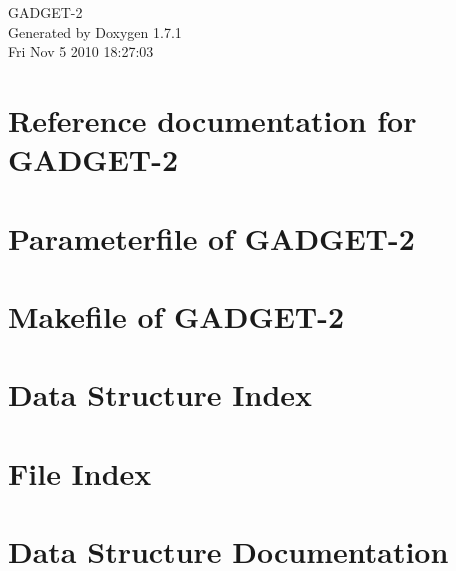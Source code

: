 \documentclass[a4paper]{book}
\begin{document}
\hypersetup{pageanchor=false}
\begin{titlepage}
\vspace*{7cm}
\begin{center}
{\Large GADGET-\/2 }\\
\vspace*{1cm}
{\large Generated by Doxygen 1.7.1}\\
\vspace*{0.5cm}
{\small Fri Nov 5 2010 18:27:03}\\
\end{center}
\end{titlepage}
\clearemptydoublepage
{}
\tableofcontents
\clearemptydoublepage
{}
\hypersetup{pageanchor=true}
\chapter{Reference documentation for GADGET-\/2}
\label{index}\hypertarget{index}{}
\chapter{Parameterfile of GADGET-\/2}
\label{parameterfile}
\hypertarget{parameterfile}{}

\chapter{Makefile of GADGET-\/2}
\label{Gadget-Makefile}
\hypertarget{Gadget-Makefile}{}

\chapter{Data Structure Index}

\chapter{File Index}

\chapter{Data Structure Documentation}

















\end{document}
